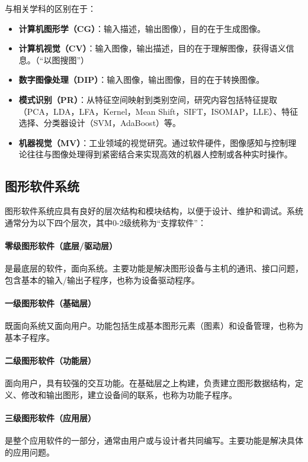 \documentclass[12pt]{article}
\begin{document}
与相关学科的区别在于：
\begin{itemize}
    \item \textbf{计算机图形学（CG）}：输入描述，输出图像），目的在于生成图像。
    \item \textbf{计算机视觉（CV）}：输入图像，输出描述，目的在于理解图像，获得语义信息。（“以图搜图”）
    \item \textbf{数字图像处理（DIP）}：输入图像，输出图像，目的在于转换图像。
    \item \textbf{模式识别（PR）}：从特征空间映射到类别空间，研究内容包括特征提取（PCA，LDA，LFA，Kernel，Mean Shift，SIFT，ISOMAP，LLE）、特征选择、分类器设计（SVM，AdaBoost）等。
    \item \textbf{机器视觉（MV）}：工业领域的视觉研究。通过软件硬件，图像感知与控制理论往往与图像处理得到紧密结合来实现高效的机器人控制或各种实时操作。
\end{itemize}

\subsection{图形软件系统}

图形软件系统应具有良好的层次结构和模块结构，以便于设计、维护和调试。系统通常分为以下四个层次，其中0-2级统称为“支撑软件”：

\paragraph{零级图形软件（底层/驱动层）}
是最底层的软件，面向系统。主要功能是解决图形设备与主机的通讯、接口问题，包含基本的输入/输出子程序，也称为设备驱动程序。

\paragraph{一级图形软件（基础层）}
既面向系统又面向用户。功能包括生成基本图形元素（图素）和设备管理，也称为基本子程序。

\paragraph{二级图形软件（功能层）}
面向用户，具有较强的交互功能。在基础层之上构建，负责建立图形数据结构，定义、修改和输出图形，建立设备间的联系，也称为功能子程序。

\paragraph{三级图形软件（应用层）}
是整个应用软件的一部分，通常由用户或与设计者共同编写。主要功能是解决具体的应用问题。
\end{document}
